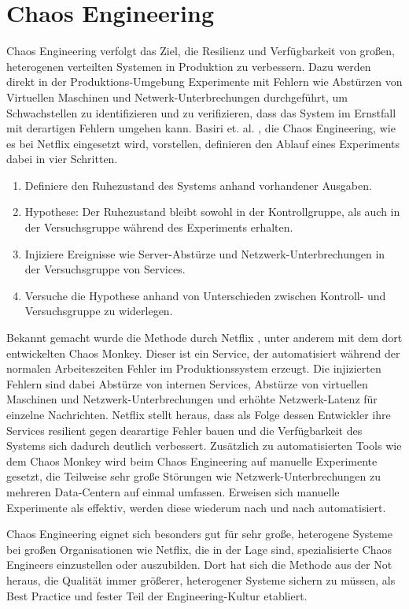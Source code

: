\documentclass[12pt,a4paper]{report}
\begin{document}
\section{Chaos Engineering}
Chaos Engineering verfolgt das Ziel, die Resilienz und Verfügbarkeit von großen, heterogenen verteilten Systemen in Produktion zu
verbessern. Dazu werden direkt in der Produktions-Umgebung Experimente mit Fehlern wie Abstürzen von Virtuellen Maschinen und
Netwerk-Unterbrechungen durchgeführt, um Schwachstellen zu identifizieren und zu verifizieren, dass das System im Ernstfall mit
derartigen Fehlern umgehen kann. Basiri et. al. \cite{chaos_engineering}, die Chaos Engineering, wie es bei Netflix eingesetzt
wird, vorstellen, definieren den Ablauf eines Experiments dabei in vier Schritten.
\begin{enumerate}
	\item Definiere den Ruhezustand des Systems anhand vorhandener Ausgaben.
	\item Hypothese: Der Ruhezustand bleibt sowohl in der Kontrollgruppe, als auch in der Versuchsgruppe während des Experiments erhalten.
	\item Injiziere Ereignisse wie Server-Abstürze und Netzwerk-Unterbrechungen in der Versuchsgruppe von Services.
	\item Versuche die Hypothese anhand von Unterschieden zwischen Kontroll- und Versuchsgruppe zu widerlegen.
\end{enumerate}
Bekannt gemacht wurde die Methode durch Netflix \cite{abstracting_the_geniuses}, unter anderem mit dem dort entwickelten Chaos
Monkey. Dieser ist ein Service, der automatisiert während der normalen Arbeiteszeiten Fehler im Produktionssystem erzeugt. Die
injizierten Fehlern sind dabei Abstürze von internen Services, Abstürze von virtuellen Maschinen und Netzwerk-Unterbrechungen und
erhöhte Netzwerk-Latenz für einzelne Nachrichten. Netflix stellt heraus, dass als Folge dessen Entwickler ihre Services resilient gegen
dearartige Fehler bauen und die Verfügbarkeit des Systems sich dadurch deutlich verbessert. Zusätzlich zu automatisierten Tools
wie dem Chaos Monkey wird beim Chaos Engineering auf manuelle Experimente gesetzt, die Teilweise sehr große Störungen wie
Netzwerk-Unterbrechungen zu mehreren Data-Centern auf einmal umfassen. Erweisen sich manuelle Experimente
als effektiv, werden diese wiederum nach und nach automatisiert. \cite{chaos_engineering}

Chaos Engineering eignet sich besonders gut für sehr große, heterogene Systeme bei großen Organisationen wie Netflix, die in der
Lage sind, spezialisierte Chaos Engineers einzustellen oder auszubilden. Dort hat sich die Methode aus der Not heraus, die
Qualität immer größerer, heterogener Systeme sichern zu müssen, als Best Practice und fester Teil der Engineering-Kultur
etabliert. \cite{abstracting_the_geniuses}
\end{document}

